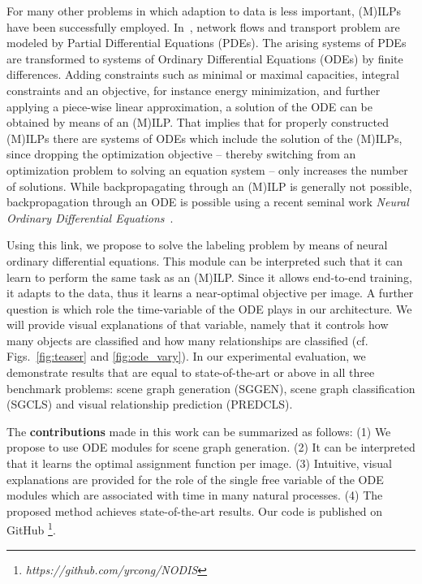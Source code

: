 \documentclass[runningheads]{llncs}
\begin{document}
For many other problems in which adaption to data is less important, (M)ILPs have been successfully employed. 
In~\cite{Fuegenschuh2006:CombinatorialModels}, network flows and transport problem are modeled by Partial Differential Equations (PDEs). 
The arising systems of PDEs are transformed to systems of Ordinary Differential Equations (ODEs) by finite differences. Adding constraints such as minimal or maximal capacities, integral constraints and an objective, for instance energy minimization, and further applying a piece-wise linear approximation, a solution of the ODE can be obtained by means of an (M)ILP. 
That implies that for properly constructed (M)ILPs there are systems of  ODEs which include the solution of the (M)ILPs, since dropping the optimization objective -- thereby switching from an optimization problem to solving an equation system -- only increases the number of solutions. While backpropagating through an (M)ILP is generally not possible, backpropagation through an ODE is possible using a recent seminal work \emph{Neural Ordinary Differential Equations}~\cite{Chen2018:NODE}.

Using this link, we propose to solve the labeling problem by means of neural ordinary differential equations. This module can be interpreted such that it can learn to perform the same task as an (M)ILP. Since it allows end-to-end training, it adapts to the data, thus it learns a near-optimal objective per image.
A further question is which role the time-variable of the ODE plays in our architecture. We will provide visual explanations of that variable, namely that it controls how many objects are classified and how many relationships are classified (cf. Figs.~\ref{fig:teaser} and \ref{fig:ode_vary}).  
In our experimental evaluation, we demonstrate results that are equal to state-of-the-art or above in all three benchmark problems: scene graph generation (SGGEN), scene graph classification (SGCLS) and visual relationship prediction (PREDCLS). 


The \textbf{contributions} made in this work can be summarized as follows:
(1) We propose to use ODE modules for scene graph generation. 
(2) It can be interpreted that it learns the optimal assignment function per image. (3) Intuitive, visual explanations are provided for the role of the single free variable of the ODE modules which are associated with time in many natural processes.
(4) The proposed method achieves state-of-the-art results. Our code is published on GitHub \footnote{\emph{https://github.com/yrcong/NODIS}}.
\end{document}
